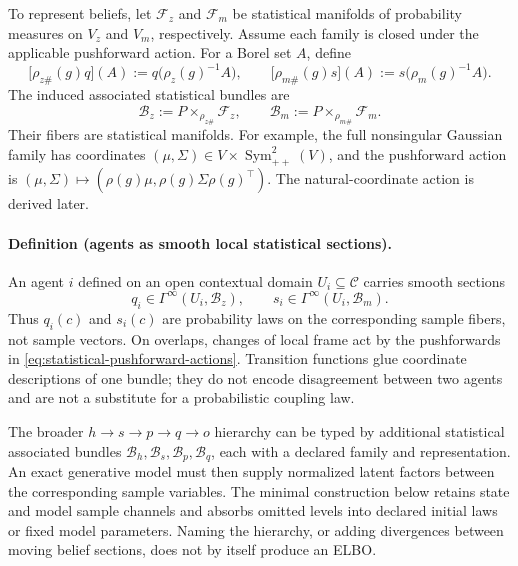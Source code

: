 To represent beliefs, let \(\mathcal F_z\) and \(\mathcal F_m\) be statistical manifolds of probability measures on \(V_z\) and \(V_m\), respectively. Assume each family is closed under the applicable pushforward action. For a Borel set \(A\), define
\begin{equation}
\bigl[\rho_{z\#}(g)q\bigr](A)
:=q\bigl(\rho_z(g)^{-1}A\bigr),
\qquad
\bigl[\rho_{m\#}(g)s\bigr](A)
:=s\bigl(\rho_m(g)^{-1}A\bigr).
\label{eq:statistical-pushforward-actions}
\end{equation}
The induced associated statistical bundles are
\begin{equation}
\mathscr B_z:=P\times_{\rho_{z\#}}\mathcal F_z,
\qquad
\mathscr B_m:=P\times_{\rho_{m\#}}\mathcal F_m.
\label{eq:associated-statistical-bundles}
\end{equation}
Their fibers are statistical manifolds. For example, the full nonsingular Gaussian family has coordinates \((\mu,\Sigma)\in V\times\operatorname{Sym}_{++}^2(V)\), and the pushforward action is \((\mu,\Sigma)\mapsto(\rho(g)\mu,\rho(g)\Sigma\rho(g)^\top)\). The natural-coordinate action is derived later.

\paragraph{Definition (agents as smooth local statistical sections).}
An agent \(i\) defined on an open contextual domain \(U_i\subseteq\mathcal C\) carries smooth sections
\begin{equation}
q_i\in\Gamma^\infty(U_i,\mathscr B_z),
\qquad
s_i\in\Gamma^\infty(U_i,\mathscr B_m).
\label{eq:agent-local-statistical-sections}
\end{equation}
Thus \(q_i(c)\) and \(s_i(c)\) are probability laws on the corresponding sample fibers, not sample vectors. On overlaps, changes of local frame act by the pushforwards in \cref{eq:statistical-pushforward-actions}. Transition functions glue coordinate descriptions of one bundle; they do not encode disagreement between two agents and are not a substitute for a probabilistic coupling law.

The broader \(h\to s\to p\to q\to o\) hierarchy can be typed by additional statistical associated bundles \(\mathscr B_h,\mathscr B_s,\mathscr B_p,\mathscr B_q\), each with a declared family and representation. An exact generative model must then supply normalized latent factors between the corresponding sample variables. The minimal construction below retains state and model sample channels and absorbs omitted levels into declared initial laws or fixed model parameters. Naming the hierarchy, or adding divergences between moving belief sections, does not by itself produce an ELBO.

